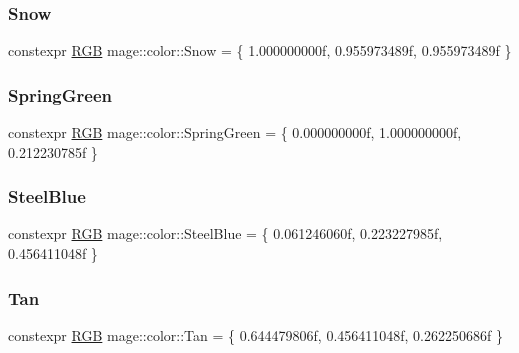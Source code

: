 \hypertarget{namespacemage_1_1color_aab49681d71304f41e6c9606093ab5b95}{}\label{namespacemage_1_1color_aab49681d71304f41e6c9606093ab5b95} 
\subsubsection{\texorpdfstring{Snow}{Snow}}
{\footnotesize\ttfamily constexpr \hyperlink{structmage_1_1_r_g_b}{R\+GB} mage\+::color\+::\+Snow = \{ 1.\+000000000f, 0.\+955973489f, 0.\+955973489f \}}

\hypertarget{namespacemage_1_1color_acb2eb0c5c4be0356ad6614ff63c36738}{}\label{namespacemage_1_1color_acb2eb0c5c4be0356ad6614ff63c36738} 
\subsubsection{\texorpdfstring{Spring\+Green}{SpringGreen}}
{\footnotesize\ttfamily constexpr \hyperlink{structmage_1_1_r_g_b}{R\+GB} mage\+::color\+::\+Spring\+Green = \{ 0.\+000000000f, 1.\+000000000f, 0.\+212230785f \}}

\hypertarget{namespacemage_1_1color_a2a4b03e450e79d03ce4e6061d54ad671}{}\label{namespacemage_1_1color_a2a4b03e450e79d03ce4e6061d54ad671} 
\subsubsection{\texorpdfstring{Steel\+Blue}{SteelBlue}}
{\footnotesize\ttfamily constexpr \hyperlink{structmage_1_1_r_g_b}{R\+GB} mage\+::color\+::\+Steel\+Blue = \{ 0.\+061246060f, 0.\+223227985f, 0.\+456411048f \}}

\hypertarget{namespacemage_1_1color_a1a70b829eefc1b4686d328747e4c712d}{}\label{namespacemage_1_1color_a1a70b829eefc1b4686d328747e4c712d} 
\subsubsection{\texorpdfstring{Tan}{Tan}}
{\footnotesize\ttfamily constexpr \hyperlink{structmage_1_1_r_g_b}{R\+GB} mage\+::color\+::\+Tan = \{ 0.\+644479806f, 0.\+456411048f, 0.\+262250686f \}}

